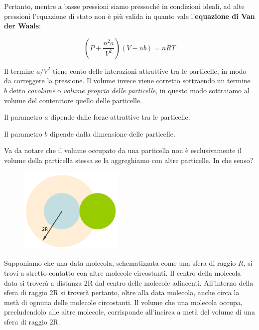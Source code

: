 Pertanto, mentre a basse pressioni siamo pressoché in condizioni ideali, ad alte pressioni l'equazione di stato non è più valida in quanto vale l'\textbf{equazione di Van der Waals}:

$$\left( P + \frac{n^2a}{V^2} \right)(V-nb)=nRT$$

Il termine $a/V^2$ tiene conto delle interazioni attrattive tra le particelle, in modo da correggere la pressione. Il volume invece viene corretto sottraendo un termine $b$ detto \textit{covolume} o \textit{volume proprio delle particelle}, in questo modo sottraiamo al volume del contenitore quello delle particelle.

Il parametro $a$ dipende dalle forze attrattive tra le particelle.

Il parametro $b$ dipende dalla dimensione delle particelle.

\vspace{0.2cm}Va da notare che il volume occupato da una particella non è esclusivamente il volume della particella stessa se la aggreghiamo con altre particelle. In che senso?

\hspace{0.5cm}\begin{minipage}{0.35 \textwidth}
    \begin{figure}[H]
        \includegraphics[width=5cm]{immagini/particelle_aggregate.png}
    \end{figure}
\end{minipage}
\begin{minipage}{0.6 \textwidth}
    \vspace{0.8cm}Supponiamo che una data molecola, schematizzata come una sfera di raggio $R$, si trovi a stretto contatto con altre molecole circostanti.
    Il centro della molecola data si troverà a distanza 2R dal centro delle
    molecole adiacenti. All’interno della sfera di raggio 2R si troverà pertanto, oltre alla data molecola, anche circa la metà di ognuna delle molecole circostanti.
    Il volume che una molecola occupa, precludendolo alle altre molecole, corrisponde all’incirca a metà del volume di una sfera di raggio 2R. 
\end{minipage}


